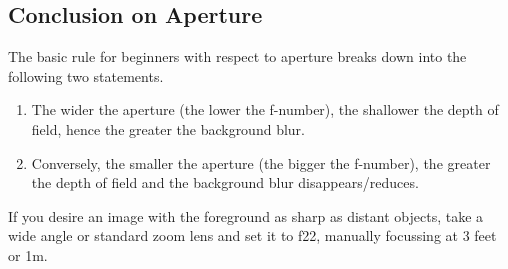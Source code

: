 \subsection{Conclusion on Aperture}

The basic rule for beginners with respect to \gls{aperture} breaks down into the following two statements.

\begin{enumerate}[1]
	\item The wider the \gls{aperture} (the lower the f-number), the shallower the depth of field, hence the greater the background blur.
	\item Conversely, the smaller the \gls{aperture} (the bigger the f-number), the greater the depth of field and the background blur disappears/reduces.
\end{enumerate} 

If you desire an image with the foreground as sharp as distant objects, take a wide angle or standard zoom lens and set it to f22, manually focussing at 3 feet or 1m. 

